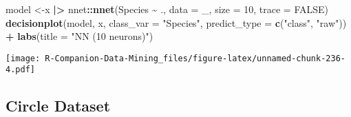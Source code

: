 \documentclass[
  notitlepage]{book}
\newenvironment{Shaded}{\begin{snugshade}}{\end{snugshade}}
\newcommand{\DataTypeTok}[1]{\textcolor[rgb]{0.13,0.29,0.53}{#1}}
\newcommand{\DecValTok}[1]{\textcolor[rgb]{0.00,0.00,0.81}{#1}}
\newcommand{\ErrorTok}[1]{\textcolor[rgb]{0.64,0.00,0.00}{\textbf{#1}}}
\newcommand{\KeywordTok}[1]{\textcolor[rgb]{0.13,0.29,0.53}{\textbf{#1}}}
\newcommand{\NormalTok}[1]{#1}
\newcommand{\OperatorTok}[1]{\textcolor[rgb]{0.81,0.36,0.00}{\textbf{#1}}}
\newcommand{\OtherTok}[1]{\textcolor[rgb]{0.56,0.35,0.01}{#1}}
\newcommand{\StringTok}[1]{\textcolor[rgb]{0.31,0.60,0.02}{#1}}
\begin{document}
\begin{Shaded}
\begin{Highlighting}[]
\NormalTok{model \textless{}{-}x }\OperatorTok{|}\ErrorTok{\textgreater{}}\StringTok{ }\NormalTok{nnet}\OperatorTok{::}\KeywordTok{nnet}\NormalTok{(Species }\OperatorTok{\textasciitilde{}}\StringTok{ }\NormalTok{., }\DataTypeTok{data =}\NormalTok{ \_, }
                        \DataTypeTok{size =} \DecValTok{10}\NormalTok{, }\DataTypeTok{trace =} \OtherTok{FALSE}\NormalTok{)}
\KeywordTok{decisionplot}\NormalTok{(model, x, }\DataTypeTok{class\_var  =} \StringTok{"Species"}\NormalTok{, }
             \DataTypeTok{predict\_type =} \KeywordTok{c}\NormalTok{(}\StringTok{"class"}\NormalTok{, }\StringTok{"raw"}\NormalTok{)) }\OperatorTok{+}\StringTok{ }
\StringTok{  }\KeywordTok{labs}\NormalTok{(}\DataTypeTok{title =} \StringTok{"NN (10 neurons)"}\NormalTok{)}
\end{Highlighting}
\end{Shaded}

\texttt{[image: R-Companion-Data-Mining\_files/figure-latex/unnamed-chunk-236-4.pdf]}

\hypertarget{circle-dataset}{%
\subsection{Circle Dataset}\label{circle-dataset}}
\end{document}
